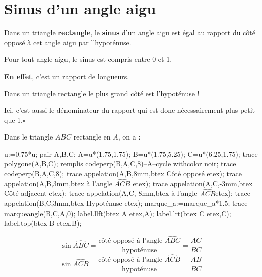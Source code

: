 \section{Sinus d'un angle aigu}
\begin{definition}
    Dans un triangle {\bfseries rectangle}, le \textbf{sinus} d'un angle aigu est égal au rapport du côté opposé à cet angle aigu par l'hypoténuse.
\end{definition}

\begin{remarque}
    Pour tout angle aigu, le sinus est compris entre 0 et 1.

    {\bfseries En effet}, c'est un rapport de longueurs.\par
    Dans un triangle rectangle le plus grand côté est l'hypoténuse !\par
    Ici, c'est aussi le dénominateur du rapport qui est donc nécessairement plus petit que 1.$\square$
\end{remarque}


\begin{exemples*1}
    Dans le triangle $ABC$ rectangle en $A$, on a : 
    
    \medskip
    \begin{minipage}{0.4\linewidth}
        \begin{Geometrie}[CoinHD={(5u,4.5u)}]
            u:=0.75*u;            
            pair A,B,C;
            A=u*(1.75,1.75);
            B=u*(1.75,5.25);
            C=u*(6.25,1.75);
            trace polygone(A,B,C);
            remplis codeperp(B,A,C,8)--A--cycle withcolor noir;
            trace codeperp(B,A,C,8);
            trace appelation(A,B,8mm,btex Côté opposé etex);
            trace appelation(A,B,3mm,btex à l'angle $\widehat{ACB}$ etex);
            trace appelation(A,C,-3mm,btex Côté adjacent etex);
            trace appelation(A,C,-8mm,btex à l'angle $\widehat{ACB}$etex);
            trace appelation(B,C,3mm,btex Hypoténuse etex);
            marque_a:=marque_a*1.5;    
            trace marqueangle(B,C,A,0);
            label.llft(btex A etex,A);
            label.lrt(btex C etex,C);
            label.top(btex B etex,B);
        \end{Geometrie}
    \end{minipage}
    \begin{minipage}{0.55\linewidth}        
        $$\sin\widehat{ABC}=\frac{\mbox{côté opposé à l'angle $\widehat{ABC}$}}{\mbox{hypoténuse}}=\frac{AC}{BC}$$
        $$\sin\widehat{ACB}=\frac{\mbox{côté opposé à l'angle $\widehat{ACB}$}}{\mbox{hypoténuse}}=\frac{AB}{BC}$$
    \end{minipage}
\end{exemples*1}


